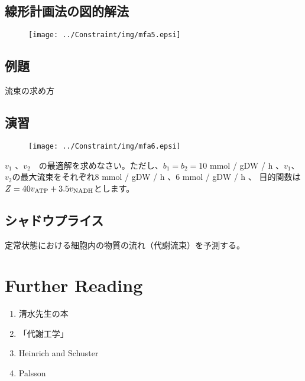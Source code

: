 \subsection{線形計画法の図的解法}
\begin{figure}[h]
\begin{center}
\texttt{[image: ../Constraint/img/mfa5.epsi]}
\end{center}
\end{figure}

\subsection{例題}
流束の求め方

\subsection{演習}
\begin{figure}[h]
\begin{center}
\texttt{[image: ../Constraint/img/mfa6.epsi]}
\end{center}
\end{figure}

\(v_1\) 、\(v_2\)　の最適解を求めなさい。ただし、\(b_1 = b_2 = 10\) mmol / gDW / h 、\(v_1\)、\(v_2\)の最大流束をそれぞれ8 mmol / gDW / h 、6 mmol / gDW / h 、
目的関数は \(Z = 40 v_{\rm ATP} + 3.5 v_{\rm NADH}\)とします。

\subsection{シャドウプライス}

定常状態における細胞内の物質の流れ（代謝流束）を予測する。



\section{Further Reading}
\begin{enumerate}
\item 清水先生の本
\item 「代謝工学」
\item Heinrich and Schuster
\item Palsson
\end{enumerate}
